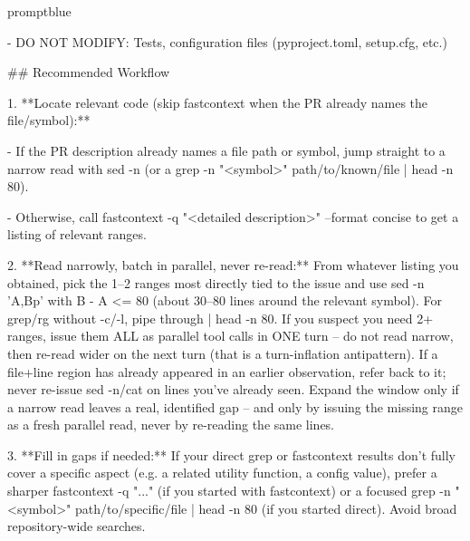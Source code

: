 \documentclass{llmxive}
\begin{document}
\begin{promptbox}{promptblue}
{- DO NOT MODIFY: Tests, configuration files (pyproject.toml, setup.cfg, etc.)\par
\vspace{0.35em}\par
\#\# Recommended Workflow\par
\vspace{0.35em}\par
1. **Locate relevant code (skip fastcontext when the PR already names the file/symbol):**\par
\hspace*{1.35em}- If the PR description already names a file path or symbol, jump straight to a narrow read with \textasciigrave{}sed -n\textasciigrave{} (or a \textasciigrave{}grep -n "\textless{}symbol\textgreater{}" path/to/known/file | head -n 80\textasciigrave{}).\par
\hspace*{1.35em}- Otherwise, call \textasciigrave{}fastcontext -q "\textless{}detailed description\textgreater{}" --format concise\textasciigrave{} to get a listing of relevant ranges.\par
2. **Read narrowly, batch in parallel, never re-read:** From whatever listing you obtained, pick the 1--2 ranges most directly tied to the issue and use \textasciigrave{}sed -n 'A,Bp'\textasciigrave{} with \textasciigrave{}B - A \textless{}= 80\textasciigrave{} (about 30--80 lines around the relevant symbol). For \textasciigrave{}grep\textasciigrave{}/\textasciigrave{}rg\textasciigrave{} without \textasciigrave{}-c\textasciigrave{}/\textasciigrave{}-l\textasciigrave{}, pipe through \textasciigrave{}| head -n 80\textasciigrave{}. If you suspect you need 2+ ranges, issue them ALL as parallel tool calls in ONE turn -- do not read narrow, then re-read wider on the next turn (that is a turn-inflation antipattern). If a file+line region has already appeared in an earlier observation, refer back to it; never re-issue \textasciigrave{}sed -n\textasciigrave{}/\textasciigrave{}cat\textasciigrave{} on lines you've already seen. Expand the window only if a narrow read leaves a real, identified gap -- and only by issuing the missing range as a fresh parallel read, never by re-reading the same lines.\par
3. **Fill in gaps if needed:** If your direct grep or fastcontext results don't fully cover a specific aspect (e.g. a related utility function, a config value), prefer a sharper \textasciigrave{}fastcontext -q "..."\textasciigrave{} (if you started with fastcontext) or a focused \textasciigrave{}grep -n "\textless{}symbol\textgreater{}" path/to/specific/file | head -n 80\textasciigrave{} (if you started direct). Avoid broad repository-wide searches.\par
}
\end{promptbox}
\end{document}
